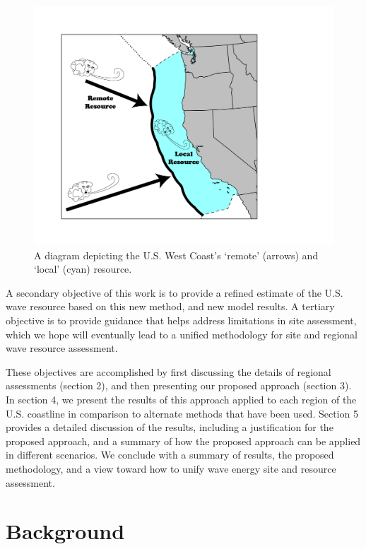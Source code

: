 \documentclass[authoryear,preprint]{elsarticle}
\begin{document}
\begin{figure}[ht]
  \centering
\includegraphics[width=0.9\linewidth]{../diagram/EEZ_contour03_edit01.png}
  \caption{A diagram depicting the U.S. West Coast’s ‘remote’ (arrows) and ‘local’ (cyan) resource.}
  \label{fig:map01}
\end{figure}

A secondary objective of this work is to provide a refined estimate of the U.S. wave resource based on this new method, and new model results. A tertiary objective is to provide guidance that helps address limitations in site assessment, which we hope will eventually lead to a unified methodology for site and regional wave resource assessment.

These objectives are accomplished by first discussing the details of regional assessments (section 2), and then presenting our proposed approach (section 3). In section 4, we present the results of this approach applied to each region of the U.S. coastline in comparison to alternate methods that have been used. Section 5 provides a detailed discussion of the results, including a justification for the proposed approach, and a summary of how the proposed approach can be applied in different scenarios. We conclude with a summary of results, the proposed methodology, and a view toward how to unify wave energy site and resource assessment.

\section{Background}
\end{document}
